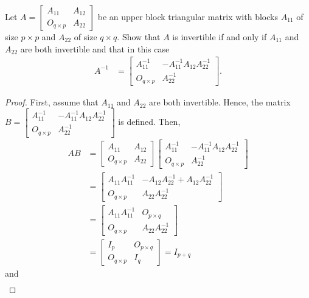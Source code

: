 \documentclass[12pt]{article}
\newenvironment{problem}[2][Problem]{\begin{trivlist} \item[\hskip \labelsep {\bfseries #1}\hskip \labelsep {\bfseries #2.}]}{\end{trivlist}}
\begin{document}
\begin{problem}{1.24}
Let $A = \begin{bmatrix} A_{11} & A_{12} \\ O_{q\times p} & A_{22}\end{bmatrix}$ be an upper block triangular matrix with blocks $A_{11}$ of size $p\times p$ and $A_{22}$ of size $q\times q$. Show that $A$ is invertible if and only if $A_{11}$ and $A_{22}$ are both invertible and that in this case  
\begin{align*}
A^{-1} &= \begin{bmatrix} A_{11}^{-1} & -A_{11}^{-1}A_{12}A_{22}^{-1}\\ O_{q\times p} & A_{22}^{-1} \end{bmatrix}. 
\end{align*}
\begin{proof}
  First, assume that $A_{11}$ and $A_{22}$ are both invertible. Hence, the matrix $B = \begin{bmatrix} A_{11}^{-1} & -A_{11}^{-1}A_{12}A_{22}^{-1}\\ O_{q\times p} & A_{22}^{-1} \end{bmatrix}$ is defined. Then,  
\begin{align*}
  AB &= \begin{bmatrix} A_{11} & A_{12} \\ O_{q\times p} & A_{22}\end{bmatrix} \begin{bmatrix} A_{11}^{-1} & -A_{11}^{-1}A_{12}A_{22}^{-1}\\ O_{q\times p} & A_{22}^{-1} \end{bmatrix} \\
  &=  \begin{bmatrix} A_{11}A_{11}^{-1} & -A_{12}A_{22}^{-1}+A_{12}A_{22}^{-1}\\ O_{q\times p} & A_{22}A_{22}^{-1}\end{bmatrix} \\
  &=  \begin{bmatrix} A_{11}A_{11}^{-1} & O_{p\times q}\\ O_{q\times p} & A_{22}A_{22}^{-1}\end{bmatrix} \\
  &= \begin{bmatrix}I_{p} & O_{p\times q}\\ O_{q\times p} & I_{q}\end{bmatrix} = I_{p+q}
\end{align*}
and
\begin{align*}

\end{align*}
\end{proof}
\end{problem}
\end{document}
